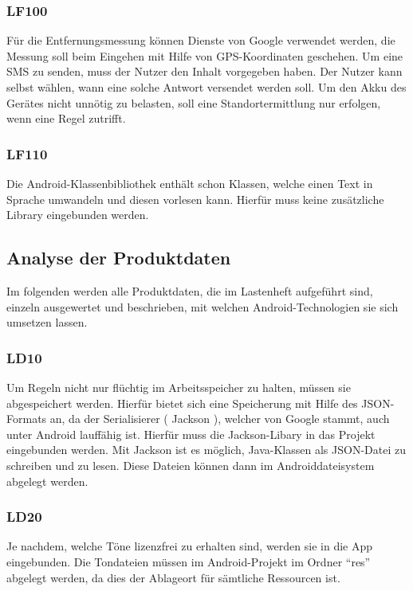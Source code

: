 \subsubsection{LF100}
F\"ur die Entfernungsmessung k\"onnen Dienste von Google verwendet werden, die Messung soll beim Eingehen mit Hilfe von GPS-Koordinaten geschehen. Um eine SMS zu senden, muss der Nutzer den Inhalt vorgegeben haben. Der Nutzer kann selbst w\"ahlen, wann eine solche Antwort versendet werden soll. Um den Akku des Ger\"ates nicht unn\"otig zu belasten, soll eine Standortermittlung nur erfolgen, wenn eine Regel zutrifft.

\subsubsection{LF110}
Die Android-Klassenbibliothek enth\"alt schon Klassen, welche einen Text in Sprache umwandeln und diesen vorlesen kann. Hierf\"ur muss keine zus\"atzliche Library eingebunden werden.

\subsection{Analyse der Produktdaten}
Im folgenden werden alle Produktdaten, die im Lastenheft aufgef\"uhrt sind, einzeln ausgewertet und beschrieben, mit welchen Android-Technologien sie sich umsetzen lassen.

\subsubsection{LD10}
Um Regeln nicht nur fl\"uchtig im Arbeitsspeicher zu halten, m\"ussen sie abgespeichert werden. Hierf\"ur bietet sich eine Speicherung mit Hilfe des JSON-Formats an, da der Serialisierer ( Jackson ), welcher von Google stammt, auch unter Android lauff\"ahig ist. Hierf\"ur muss die Jackson-Libary in das Projekt eingebunden werden.
Mit Jackson ist es m\"oglich, Java-Klassen als JSON-Datei zu schreiben und zu lesen. Diese Dateien k\"onnen dann im Androiddateisystem abgelegt werden.

\subsubsection{LD20}
Je nachdem, welche T\"one lizenzfrei zu erhalten sind, werden sie in die App eingebunden. Die Tondateien m\"ussen im Android-Projekt im Ordner "`res"' abgelegt werden, da dies der Ablageort f\"ur s\"amtliche Ressourcen ist.

